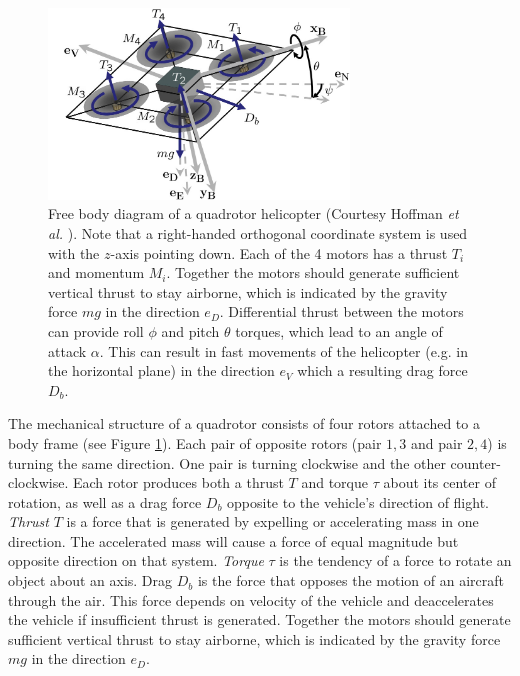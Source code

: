 \begin{figure}[htb]
\centering
\includegraphics[width=8cm]{images/QuadRotorBody.png}
\caption{Free body diagram of a quadrotor helicopter 
(Courtesy Hoffman \textit{et al.} \cite{Hoffmann2007}). Note that a right-handed orthogonal coordinate system is used with the $z$-axis pointing down. Each of the 4 motors has a thrust $T_i$ and momentum $M_i$. Together the motors should generate sufficient vertical thrust to stay airborne, which is indicated by the gravity force $mg$ in the direction $e_D$. Differential thrust between the motors can provide roll $\phi$ and pitch $\theta$ torques, which lead to an angle of attack $\alpha$. This can result in fast movements of the helicopter (e.g. in the horizontal plane) in the direction $e_V$ which a resulting drag force $D_b$. }
\label{fig:QuadRotorBody}
\end{figure}

The mechanical structure of a quadrotor consists of four rotors attached to a body frame (see Figure \ref{fig:QuadRotorBody}).
Each pair of opposite rotors (pair ${1, 3}$ and pair ${2, 4}$) is turning the same direction.
One pair is turning clockwise and the other counter-clockwise.
Each rotor produces both a thrust $T$ and torque $\tau$ about its center of rotation, as well as a drag force $D_b$ opposite to the vehicle's direction of flight.
\textit{Thrust} $T$ is a force that is generated by expelling or accelerating mass in one direction.
The accelerated mass will cause a force of equal magnitude but opposite direction on that system.
\textit{Torque} $\tau$ is the tendency of a force to rotate an object about an axis.
Drag $D_b$ is the force that opposes the motion of an aircraft through the air.
This force depends on velocity of the vehicle and deaccelerates the vehicle if insufficient thrust is generated.
Together the motors should generate sufficient vertical thrust to stay airborne, which is indicated by the gravity force $mg$ in the direction $e_D$.

